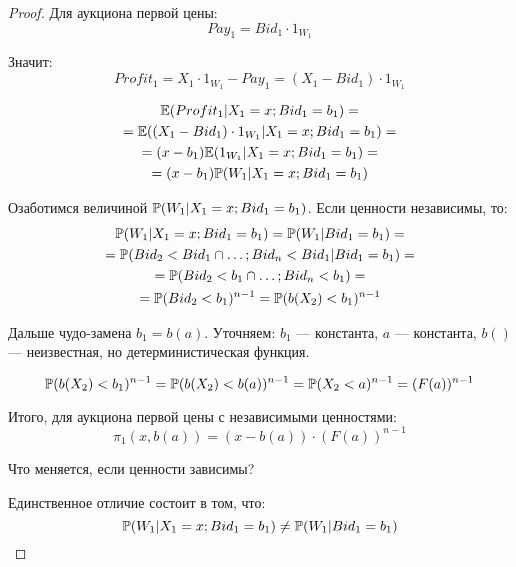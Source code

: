 \begin{proof}
Для аукциона первой цены:
\begin{equation}
Pay_{1}=Bid_{1}\cdot 1_{W_{1}}
\end{equation}

Значит:
\begin{equation}
Profit_{1}=X_{1}\cdot 1_{W_{1}}-Pay_{1}=(X_{1}-Bid_{1})\cdot 1_{W_{1}}
\end{equation}



\begin{multline}
\E(Profit_{1}|X_{1}=x ; Bid_{1}=b_{1})=\\
=\E((X_{1}-Bid_{1})\cdot 1_{W_{1}}|X_{1}= x ; Bid_{1}=b_{1})=\\
= (x-b_{1})\E(1_{W_{1}}|X_{1}=x ; Bid_{1}=b_{1})=\\
=(x-b_{1})\P(W_{1}|X_{1}=x ; Bid_{1}=b_{1})
\end{multline}

Озаботимся величиной $ \P(W_{1}|X_{1}=x ; Bid_{1}=b_{1}) $. Если ценности независимы, то:
\begin{multline}
\P(W_{1}|X_{1}=x ; Bid_{1}=b_{1})=\P(W_{1}|Bid_{1}=b_{1})= \\
=\P(Bid_{2}<Bid_{1}\cap \ldots ; Bid_{n}<Bid_{1}|Bid_{1}=b_{1})=\\
=\P(Bid_{2}<b_{1}\cap \ldots ; Bid_{n}<b_{1})=\\
=\P(Bid_{2}<b_{1})^{n-1}=\P(b(X_{2})<b_{1})^{n-1}
\end{multline}

Дальше чудо-замена $ b_{1}=b(a) $. Уточняем: $ b_{1} $ — константа, $ a $ — константа, $ b() $ — неизвестная, но детерминистическая функция.

\begin{equation}
\P(b(X_{2})<b_{1})^{n-1}=\P(b(X_{2})<b(a))^{n-1}=\P(X_{2}<a)^{n-1}=(F(a))^{n-1}
\end{equation}

Итого, для аукциона первой цены с независимыми ценностями:
\begin{equation}
\pi_{1}(x,b(a))=(x-b(a))\cdot (F(a))^{n-1}
\end{equation}

Что меняется, если ценности зависимы?

Единственное отличие состоит в том, что:
\begin{equation}
\P(W_{1}|X_{1}=x ; Bid_{1}=b_{1}) \neq \P(W_{1}|Bid_{1}=b_{1})
\end{equation}


\end{proof}
